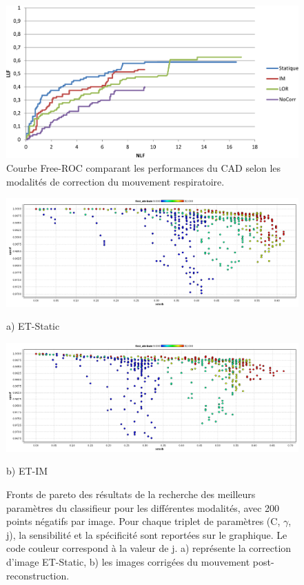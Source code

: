 \begin{figure}[h!]
 \begin{center}
   \includegraphics[width=15cm]{images/FROC_mod19}
 \end{center}
 \caption{ \label{lab:froc_mod19} Courbe Free-ROC comparant les performances du CAD selon les modalités de correction du mouvement respiratoire.}
\end{figure}


\begin{figure}[h!]

\begin{center}
 \includegraphics[width=14cm]{images/pareto_mod_Static19.png}

{\small a) ET-Static}
\vspace{0.5cm}

 \includegraphics[width=14cm]{images/pareto_mod_IM19.png}

{\small b) ET-IM}

\end{center}
 \caption{\label{fig:paretoModalite19_1} Fronts de pareto des résultats de la recherche des meilleurs paramètres du classifieur pour les différentes modalités, avec 200 points négatifs par image. Pour chaque triplet de paramètres (C, $\gamma$, j), la sensibilité et la spécificité sont reportées sur le graphique. Le code couleur correspond à la valeur de j. a) représente la correction d'image ET-Static, b) les images corrigées du mouvement post-reconstruction.}
\end{figure}

